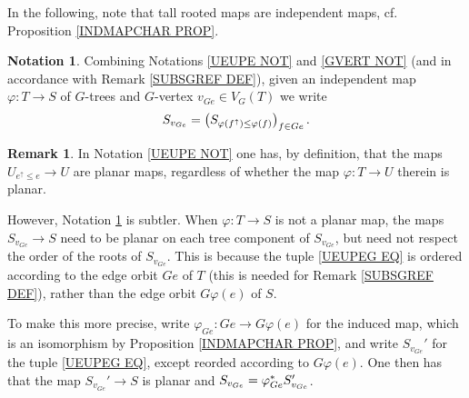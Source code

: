\documentclass[a4paper,10pt
,draft
]{article}%
\numberwithin{equation}{section}
\numberwithin{figure}{section}
\theoremstyle{definition} %
\newtheorem{remark}[equation]{Remark}%
\newtheorem{notation}[equation]{Notation}%
\newcommand{\1}{\ensuremath{\mathbbm 1}}%
\begin{document}
In the following, 
note that tall rooted maps are independent maps,
cf. Proposition \ref{INDMAPCHAR PROP}.

\begin{notation}\label{UEUPEG NOT}
	Combining Notations \ref{UEUPE NOT} and \ref{GVERT NOT}
	(and in accordance with Remark \ref{SUBSGREF DEF}),
	given an independent map
	$\varphi \colon T \to S$ of $G$-trees
	and $G$-vertex $v_{Ge} \in V_G(T)$
	we write
	\begin{equation}\label{UEUPEG EQ}
	S_{v_{Ge}} = 
	\left(S_{\varphi(f^{\uparrow}) \leq \varphi(f)}\right)_{f \in Ge}.\index{vertices/outer subtrees!SVGE@$S_{v_{Ge}}$}
	\end{equation}
\end{notation}


\begin{remark}\label{WHYALT REM}
	In Notation \ref{UEUPE NOT} one has,
	by definition,
	that the maps $U_{e^{\uparrow} \leq e} \to U$
	are planar maps, regardless of whether the map
	$\varphi \colon T \to U$ therein is planar.

	However, Notation \ref{UEUPEG NOT} is subtler.
	When $\varphi \colon T \to S$ is not a planar map,
	the maps $S_{v_{Ge}} \to S$ need to be planar on each tree component of $S_{v_{Ge}}$, but need not respect the order of the roots of $S_{v_{Ge}}$.
	This is because the tuple \eqref{UEUPEG EQ} 
	is ordered according to the edge orbit $Ge$ of $T$
	(this is needed for Remark \ref{SUBSGREF DEF}),
	rather than the edge orbit $G\varphi(e)$ of $S$.
	
	To make this more precise, write 
	$\varphi_{Ge} \colon Ge \to G \varphi(e)$
	for the induced map, which
	is an isomorphism by
	Proposition \ref{INDMAPCHAR PROP},
	and write $S_{v_{Ge}}'$ for the tuple \eqref{UEUPEG EQ},
	except reorded according to $G \varphi(e)$.
	One then has that the map
	$S_{v_{Ge}}' \to S$ is planar
	and $S_{v_{Ge}} = \varphi_{Ge}^{\**} S_{v_{Ge}}'$.
\end{remark}
\end{document}
